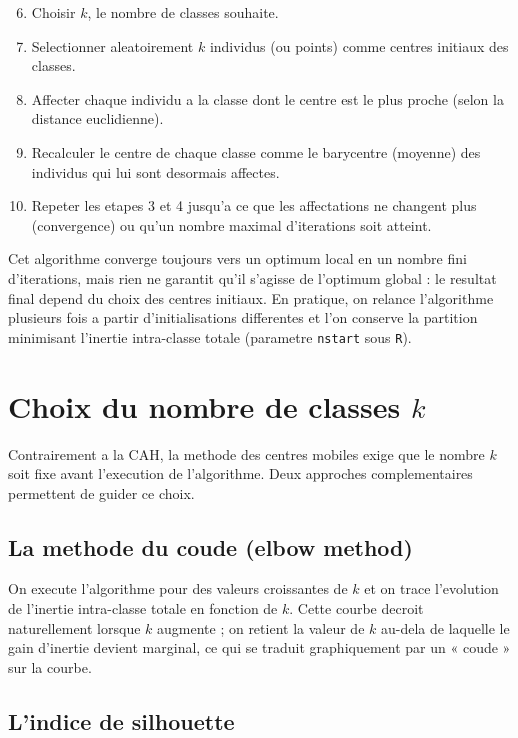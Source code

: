 \documentclass[12pt,a4paper]{book}
\newcommand{\R}{\texttt{R}}
\begin{document}
	\begin{enumerate}
		\setcounter{enumi}{5}
		\item Choisir $k$, le nombre de classes souhaite.
		\item Selectionner aleatoirement $k$ individus (ou points) comme centres initiaux des classes.
		\item Affecter chaque individu a la classe dont le centre est le plus proche (selon la distance euclidienne).
		\item Recalculer le centre de chaque classe comme le barycentre (moyenne) des individus qui lui sont desormais affectes.
		\item Repeter les etapes 3 et 4 jusqu'a ce que les affectations ne changent plus (convergence) ou qu'un nombre maximal d'iterations soit atteint.
	\end{enumerate}
	
	Cet algorithme converge toujours vers un optimum local en un nombre fini d'iterations, mais rien ne garantit qu'il s'agisse de l'optimum global : le resultat final depend du choix des centres initiaux. En pratique, on relance l'algorithme plusieurs fois a partir d'initialisations differentes et l'on conserve la partition minimisant l'inertie intra-classe totale (parametre \texttt{nstart} sous \R).
	
	\section{Choix du nombre de classes $k$}
	
	Contrairement a la CAH, la methode des centres mobiles exige que le nombre $k$ soit fixe avant l'execution de l'algorithme. Deux approches complementaires permettent de guider ce choix.
	
	\subsection{La methode du coude (elbow method)}
	
	On execute l'algorithme pour des valeurs croissantes de $k$ et on trace l'evolution de l'inertie intra-classe totale en fonction de $k$. Cette courbe decroit naturellement lorsque $k$ augmente ; on retient la valeur de $k$ au-dela de laquelle le gain d'inertie devient marginal, ce qui se traduit graphiquement par un « coude » sur la courbe.
	
	\subsection{L'indice de silhouette}
	
\end{document}
